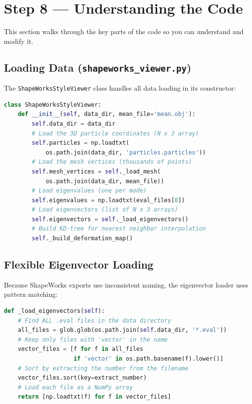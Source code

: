 \documentclass[12pt,a4paper]{article}
\begin{document}
\section{Step 8 --- Understanding the Code}

This section walks through the key parts of the code so you can understand and modify it.

\subsection{Loading Data (\texttt{shapeworks\_viewer.py})}

The \texttt{ShapeWorksStyleViewer} class handles all data loading in its constructor:

\begin{lstlisting}[language=Python, title={\textbf{Constructor --- loading all data}}]
class ShapeWorksStyleViewer:
    def __init__(self, data_dir, mean_file='mean.obj'):
        self.data_dir = data_dir
        # Load the 3D particle coordinates (N x 3 array)
        self.particles = np.loadtxt(
            os.path.join(data_dir, 'particles.particles'))
        # Load the mesh vertices (thousands of points)
        self.mesh_vertices = self._load_mesh(
            os.path.join(data_dir, mean_file))
        # Load eigenvalues (one per mode)
        self.eigenvalues = np.loadtxt(eval_files[0])
        # Load eigenvectors (list of N x 3 arrays)
        self.eigenvectors = self._load_eigenvectors()
        # Build KD-tree for nearest neighbor interpolation
        self._build_deformation_map()
\end{lstlisting}

\subsection{Flexible Eigenvector Loading}

Because ShapeWorks exports use inconsistent naming, the eigenvector loader uses pattern matching:

\begin{lstlisting}[language=Python, title={\textbf{Flexible eigenvector file discovery}}]
def _load_eigenvectors(self):
    # Find ALL .eval files in the data directory
    all_files = glob.glob(os.path.join(self.data_dir, '*.eval'))
    # Keep only files with 'vector' in the name
    vector_files = [f for f in all_files
                    if 'vector' in os.path.basename(f).lower()]
    # Sort by extracting the number from the filename
    vector_files.sort(key=extract_number)
    # Load each file as a NumPy array
    return [np.loadtxt(f) for f in vector_files]
\end{lstlisting}
\end{document}
